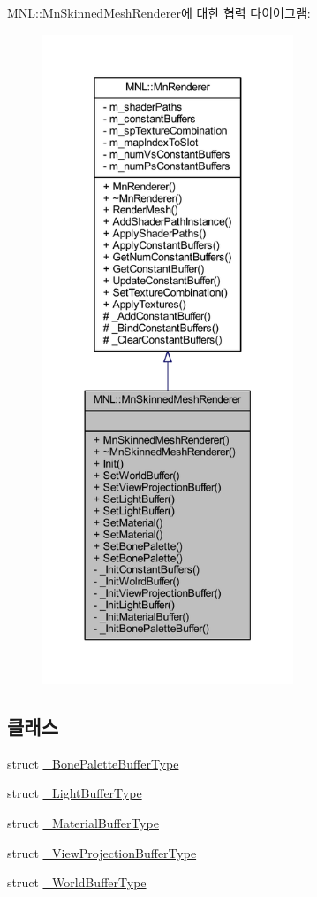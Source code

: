 M\+NL\+:\+:Mn\+Skinned\+Mesh\+Renderer에 대한 협력 다이어그램\+:\nopagebreak
\begin{figure}[H]
\begin{center}
\leavevmode
\includegraphics[height=550pt]{class_m_n_l_1_1_mn_skinned_mesh_renderer__coll__graph}
\end{center}
\end{figure}
\subsection*{클래스}
\begin{DoxyCompactItemize}
\item 
struct \hyperlink{struct_m_n_l_1_1_mn_skinned_mesh_renderer_1_1___bone_palette_buffer_type}{\+\_\+\+Bone\+Palette\+Buffer\+Type}
\item 
struct \hyperlink{struct_m_n_l_1_1_mn_skinned_mesh_renderer_1_1___light_buffer_type}{\+\_\+\+Light\+Buffer\+Type}
\item 
struct \hyperlink{struct_m_n_l_1_1_mn_skinned_mesh_renderer_1_1___material_buffer_type}{\+\_\+\+Material\+Buffer\+Type}
\item 
struct \hyperlink{struct_m_n_l_1_1_mn_skinned_mesh_renderer_1_1___view_projection_buffer_type}{\+\_\+\+View\+Projection\+Buffer\+Type}
\item 
struct \hyperlink{struct_m_n_l_1_1_mn_skinned_mesh_renderer_1_1___world_buffer_type}{\+\_\+\+World\+Buffer\+Type}
\end{DoxyCompactItemize}
